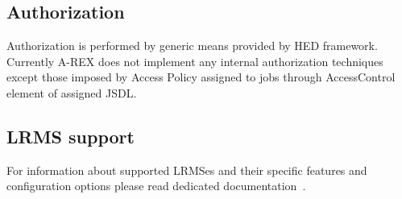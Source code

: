 \documentclass{article}                            %
\begin{document}
\subsection{Authorization\label{sub:Authorization}}

Authorization is performed by generic means provided by HED framework.
Currently A-REX does not implement any internal authorization techniques
except those imposed by Access Policy assigned to jobs through AccessControl
element of assigned JSDL.

\subsection{LRMS support\label{sub:LRMS}}

For information about supported LRMSes and their specific features
and configuration options please read dedicated documentation~\cite{arc1-backends}.
\end{document}
